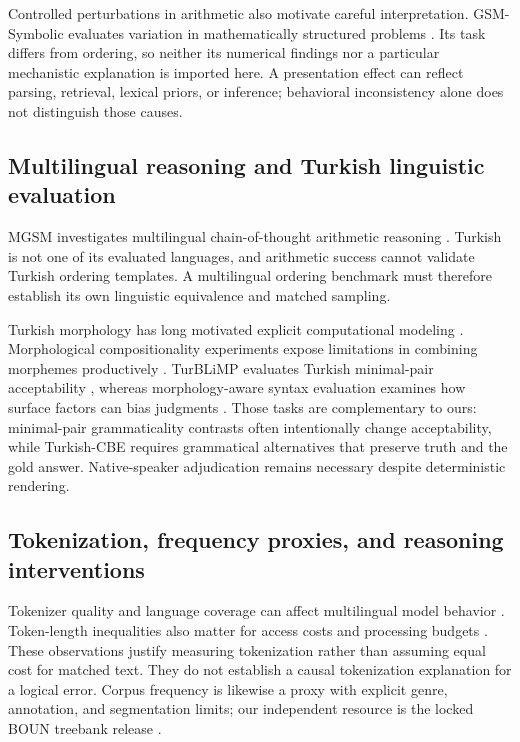 Controlled perturbations in arithmetic also motivate careful interpretation. GSM-Symbolic evaluates
variation in mathematically structured problems \citep{mirzadeh2025gsm}. Its task differs from ordering, so
neither its numerical findings nor a particular mechanistic explanation is imported here. A presentation
effect can reflect parsing, retrieval, lexical priors, or inference; behavioral inconsistency alone does not
distinguish those causes.

\subsection{Multilingual reasoning and Turkish linguistic evaluation}

MGSM investigates multilingual chain-of-thought arithmetic reasoning \citep{shi2023mgsm}. Turkish is not
one of its evaluated languages, and arithmetic success cannot validate Turkish ordering templates. A
multilingual ordering benchmark must therefore establish its own linguistic equivalence and matched
sampling.

Turkish morphology has long motivated explicit computational modeling \citep{oflazer1994turkish}.
Morphological compositionality experiments expose limitations in combining morphemes productively
\citep{ismayilzada2025morphology}. TurBLiMP evaluates Turkish minimal-pair acceptability
\citep{basar2025turblimp}, whereas morphology-aware syntax evaluation examines how surface factors can bias
judgments \citep{basar2026morphologyaware}. Those tasks are complementary to ours: minimal-pair
grammaticality contrasts often intentionally change acceptability, while Turkish-CBE requires grammatical
alternatives that preserve truth and the gold answer. Native-speaker adjudication remains necessary despite
deterministic rendering.

\subsection{Tokenization, frequency proxies, and reasoning interventions}

Tokenizer quality and language coverage can affect multilingual model behavior \citep{rust2021tokenizer}.
Token-length inequalities also matter for access costs and processing budgets \citep{ahia2023languages,
petrov2023tokenizers}. These observations justify measuring tokenization rather than assuming equal cost
for matched text. They do not establish a causal tokenization explanation for a logical error. Corpus
frequency is likewise a proxy with explicit genre, annotation, and segmentation limits; our independent
resource is the locked BOUN treebank release \citep{turk2022boun}.

